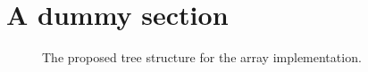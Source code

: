 






\section{A dummy section}







\begin{figure}[!h]
	\centering
	\caption{The proposed tree structure for the array implementation.}
\end{figure}

\clearpage